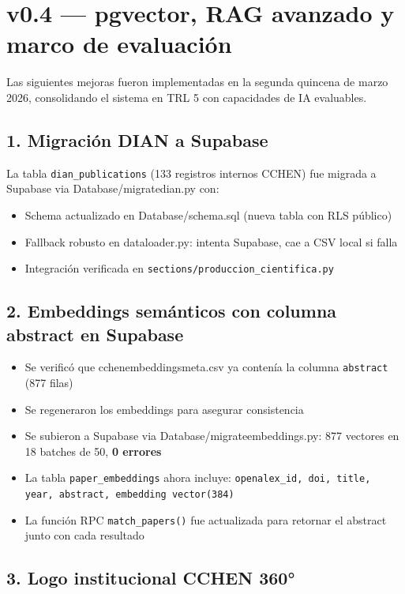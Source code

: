 \documentclass[12pt,a4paper]{report}
\newcommand{\filebreak}{\char95\allowbreak}
\newcommand{\file}[1]{{\color{cchenblue}\ttfamily\let\_\filebreak #1}}
\begin{document}
\section*{v0.4 --- pgvector, RAG avanzado y marco de evaluación}

Las siguientes mejoras fueron implementadas en la segunda quincena de marzo 2026, consolidando el sistema en TRL 5 con capacidades de IA evaluables.

\subsection*{1. Migración DIAN a Supabase}

La tabla \texttt{dian\_publications} (133 registros internos CCHEN) fue migrada a Supabase via \file{Database/migrate\_dian.py} con:
\begin{itemize}
  \item Schema actualizado en \file{Database/schema.sql} (nueva tabla con RLS público)
  \item Fallback robusto en \file{data\_loader.py}: intenta Supabase, cae a CSV local si falla
  \item Integración verificada en \texttt{sections/produccion\_cientifica.py}
\end{itemize}

\subsection*{2. Embeddings semánticos con columna abstract en Supabase}

\begin{itemize}
  \item Se verificó que \file{cchen\_embeddings\_meta.csv} ya contenía la columna \texttt{abstract} (877 filas)
  \item Se regeneraron los embeddings para asegurar consistencia
  \item Se subieron a Supabase via \file{Database/migrate\_embeddings.py}: 877 vectores en 18 batches de 50, \textbf{0 errores}
  \item La tabla \texttt{paper\_embeddings} ahora incluye: \texttt{openalex\_id, doi, title, year, abstract, embedding vector(384)}
  \item La función RPC \texttt{match\_papers()} fue actualizada para retornar el abstract junto con cada resultado
\end{itemize}

\subsection*{3. Logo institucional CCHEN 360°}
\end{document}
